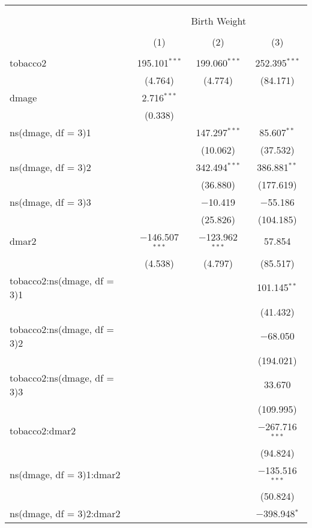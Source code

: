 \documentclass{article}
\begin{document}
\begin{table}[!htbp] \centering 
  \caption{} 
  \label{tab:splineresults} 
\begin{tabular}{lccc} 
\\[-1.8ex]\hline 
\hline \\[-1.8ex] 
\\[-1.8ex] & \multicolumn{3}{c}{Birth Weight} \\ 
\\[-1.8ex] & (1) & (2) & (3)\\ 
\hline \\[-1.8ex] 
 tobacco2 & 195.101$^{***}$ & 199.060$^{***}$ & 252.395$^{***}$ \\ 
  & (4.764) & (4.774) & (84.171) \\ 
  dmage & 2.716$^{***}$ &  &  \\ 
  & (0.338) &  &  \\ 
  ns(dmage, df = 3)1 &  & 147.297$^{***}$ & 85.607$^{**}$ \\ 
  &  & (10.062) & (37.532) \\ 
  ns(dmage, df = 3)2 &  & 342.494$^{***}$ & 386.881$^{**}$ \\ 
  &  & (36.880) & (177.619) \\ 
  ns(dmage, df = 3)3 &  & $-$10.419 & $-$55.186 \\ 
  &  & (25.826) & (104.185) \\ 
  dmar2 & $-$146.507$^{***}$ & $-$123.962$^{***}$ & 57.854 \\ 
  & (4.538) & (4.797) & (85.517) \\ 
  tobacco2:ns(dmage, df = 3)1 &  &  & 101.145$^{**}$ \\ 
  &  &  & (41.432) \\ 
  tobacco2:ns(dmage, df = 3)2 &  &  & $-$68.050 \\ 
  &  &  & (194.021) \\ 
  tobacco2:ns(dmage, df = 3)3 &  &  & 33.670 \\ 
  &  &  & (109.995) \\ 
  tobacco2:dmar2 &  &  & $-$267.716$^{***}$ \\ 
  &  &  & (94.824) \\ 
  ns(dmage, df = 3)1:dmar2 &  &  & $-$135.516$^{***}$ \\ 
  &  &  & (50.824) \\ 
  ns(dmage, df = 3)2:dmar2 &  &  & $-$398.948$^{*}$ \\ 

\end{tabular}
\end{table}
\end{document}
